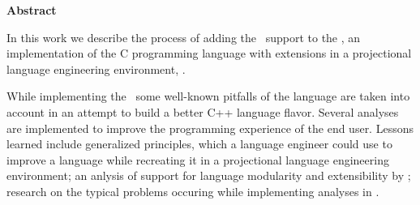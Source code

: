 

\clearemptydoublepage
{}
{}	





\vspace*{2cm}
\begin{center}
{\Large \bf Abstract}
\end{center}
\vspace{1cm}

In this work we describe the process of adding the \cpppl\ support to the \mbdp, an implementation of the
C programming language with extensions in a projectional language engineering environment, \jbmps. 

While implementing the \cpppl\ some well-known pitfalls of the language are taken into account
in an attempt to build a better C++ language flavor. Several analyses are implemented to improve
the programming experience of the end user. Lessons learned include generalized principles, 
which a language engineer could use to improve a language while recreating it in a projectional language 
engineering environment; an anlysis of support for language modularity and extensibility  by \jbmps;
research on the typical problems occuring while implementing analyses in \jbmps.
